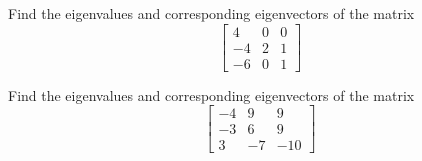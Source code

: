 \begin{exercise}\ansMark%
Find the eigenvalues and corresponding eigenvectors of the matrix 
\[ \begin{bmatrix} 4 & 0 & 0 \\ -4 & 2 & 1 \\ -6 & 0 & 1 \end{bmatrix} \]
\end{exercise}

\begin{exercise}\ansMark%
Find the eigenvalues and corresponding eigenvectors of the matrix 
\[ \begin{bmatrix} -4 & 9 & 9 \\ -3 & 6 & 9 \\ 3 & -7 & -10 \end{bmatrix} \]
\end{exercise}

